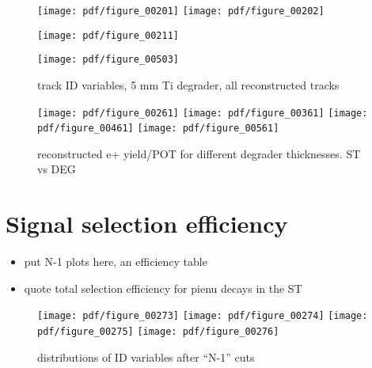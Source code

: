 \begin{figure}[H]
  \texttt{[image: pdf/figure\_00201]}
  \texttt{[image: pdf/figure\_00202]}
  \caption{
  }
\end{figure}

\begin{figure}[H]
  \texttt{[image: pdf/figure\_00211]}
  \caption{
  }
\end{figure}

\begin{figure}[H]
  \texttt{[image: pdf/figure\_00503]}
  \caption{
    track ID variables, 5 mm Ti degrader, all reconstructed tracks
  }
\end{figure}

\begin{figure}[H]
  \texttt{[image: pdf/figure\_00261]}
  \texttt{[image: pdf/figure\_00361]}
  \texttt{[image: pdf/figure\_00461]}
  \texttt{[image: pdf/figure\_00561]}
  \caption{
    reconstructed e+ yield/POT for different degrader thicknesses.
    ST vs DEG
  }
\end{figure}


\section{Signal selection efficiency}

{\red
  \begin{itemize}
  \item 
    put N-1 plots here, an efficiency table
  \item
    quote total selection efficiency for pienu decays in the ST
  \end{itemize}
}

\begin{figure}[H]
  \texttt{[image: pdf/figure\_00273]}
  \texttt{[image: pdf/figure\_00274]}
  \texttt{[image: pdf/figure\_00275]}
  \texttt{[image: pdf/figure\_00276]}
  \caption{
    distributions of ID variables after ``N-1'' cuts
  }
\end{figure}


